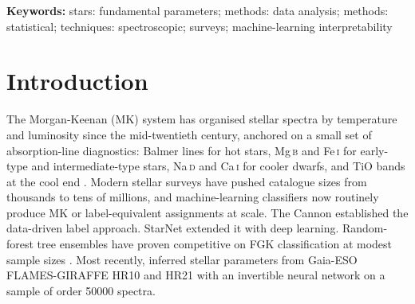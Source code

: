 \documentclass[11pt,a4paper]{article}
\newcommand{\Mgb}{Mg\,\textsc{b}\xspace}
\newcommand{\NaD}{Na\,\textsc{d}\xspace}
\newcommand{\CaI}{Ca\,\textsc{i}\xspace}
\newcommand{\FeI}{Fe\,\textsc{i}\xspace}
\newcommand{\dA}{\Delta A}
\begin{document}
\begin{abstract}
\noindent An independent 5th-order Legendre continuum re-derivation on the same 145 K-class test rows shifts the (\Mgb, K) effect to $-0.034$ ($p = 0.002$) and collapses G-class baseline accuracy from 0.97 to 0.15, revealing that the inherited Gaia-ESO continuum encodes a per-class continuum-level signal the model exploits as a non-line shortcut. Fe~i / Cr~i mid-5200~\AA{} multiplet ablation returns $\dA_K = -0.021$ ($p = 0.002$) under the production continuum and $\dA_K = -0.028$ ($p = 0.002$) under the polynomial re-derivation, so K-class dependence on substituted metal-line multiplets is present and stable across continuum conventions. The K-class result is therefore a multi-leg shortcut combining the inherited continuum-level signal with Fe~i / Cr~i multiplet substitution in place of the canonical \Mgb / \NaD / \CaI diagnostics, and the audit detects the active leg under each continuum convention. We conclude that masked-line ablation is a falsifiable audit instrument with sharper teeth than correlational interpretability, that strong aggregate metrics on stellar classifiers can hide per-class diagnostic substitutions and pipeline-level continuum shortcuts that only an interventional probe will surface, and that no correlational tool (SHAP, permutation, occlusion) would have surfaced the continuum-level leg of the K-class shortcut on this dataset.
\end{abstract}

\noindent \textbf{Keywords:} stars: fundamental parameters; methods: data analysis; methods: statistical; techniques: spectroscopic; surveys; machine-learning interpretability

\section{Introduction}
\label{sec:intro}

The Morgan-Keenan (MK) system has organised stellar spectra by temperature and luminosity since the mid-twentieth century, anchored on a small set of absorption-line diagnostics: Balmer lines for hot stars, \Mgb and \FeI for early-type and intermediate-type stars, \NaD and \CaI for cooler dwarfs, and TiO bands at the cool end \citep{GrayCorbally2009}. Modern stellar surveys have pushed catalogue sizes from thousands to tens of millions, and machine-learning classifiers now routinely produce MK or label-equivalent assignments at scale. The Cannon \citep{2015ApJ...808...16N} established the data-driven label approach. StarNet \citep{2018MNRAS.475.2978F} extended it with deep learning. Random-forest tree ensembles have proven competitive on FGK classification at modest sample sizes \citep{2019RAA....19..111L}. Most recently, \citet{2024A&A...692A.228C} inferred stellar parameters from Gaia-ESO FLAMES-GIRAFFE HR10 and HR21 with an invertible neural network on a sample of order 50000 spectra.
\end{document}
